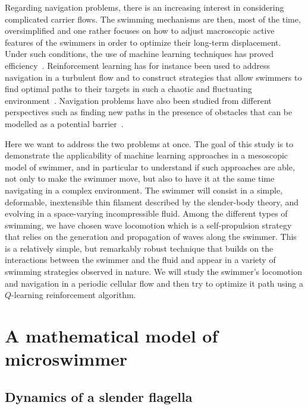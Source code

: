 \documentclass[aps,prl,preprint,groupedaddress]{revtex4-2}
\begin{document}
Regarding navigation problems, there is an increasing interest in considering complicated carrier flows. The swimming mechanisms are then, most of the time, oversimplified and one rather focuses on how to adjust macroscopic active features of the swimmers in order to optimize their long-term displacement. Under such conditions, the use of machine learning techniques has proved efficiency~\cite{cichos2020machine}. Reinforcement learning has for instance been used to address navigation in a turbulent flow and to construct strategies that allow swimmers to find optimal paths to their targets in such a chaotic and fluctuating environment~\cite{reddy2016learning,colabrese2017flow,alageshan2020machine}. Navigation problems have also been studied from different perspectives such as finding new paths in the presence of obstacles that can be modelled as a potential barrier~\cite{schneider2019optimal}. 

Here we want to address the two problems at once.  The goal of this study is to demonstrate the applicability of machine learning approaches in a mesoscopic model of swimmer, and in particular to understand if such approaches are able, not only to make the swimmer move, but also to have it at the same time navigating in a complex environment. The swimmer will consist in a simple, deformable, inextensible thin filament described by the slender-body theory, and evolving in a space-varying incompressible fluid. Among the different types of swimming, we have chosen wave locomotion which is a self-propulsion strategy that relies on the generation and propagation of waves along the swimmer. This is a relatively simple, but remarkably robust technique that builds on the interactions between the swimmer and the fluid and appear in a variety of swimming strategies observed in nature. We will study the swimmer's locomotion and navigation in a periodic cellular flow and then try to optimize it path using a $Q$-learning reinforcement algorithm.



\section{A mathematical model of microswimmer}

\subsection{Dynamics of a slender flagella}
\end{document}
